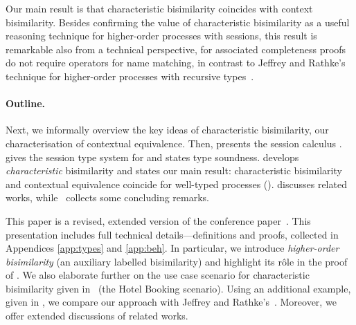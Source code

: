 Our main result is that characteristic  %
bisimilarity coincides with context bisimilarity.
Besides confirming the value of characteristic bisimilarity as a useful reasoning technique for 
higher-order processes with sessions,
this result is 
remarkable 
also from a technical perspective, for associated 
completeness proofs do not require 
operators for 
name matching,
in contrast to Jeffrey and Rathke's technique for higher-order processes
with recursive types~\cite{JeffreyR05}.




\paragraph{Outline.} 
Next,
we  informally overview the
key ideas of characteristic bisimilarity, 
our 
characterisation of contextual equivalence.
Then,   presents 
the %
session calculus \HOp. 
 gives the session type system for \HOp
and states type soundness.
{} 
develops %
\emph{characteristic} bisimilarity and 
states our main result: characteristic bisimilarity and contextual equivalence coincide for 
well-typed \HOp processes ().
 discusses related works, while
~collects some concluding remarks. 

This paper is a revised, extended version of the conference paper~\cite{kouzapas_et_al:LIPIcs:2015:5365}.
This presentation includes full technical details---definitions and proofs, collected in Appendices \ref{app:types} and \ref{app:beh}.
In particular, we introduce \emph{higher-order bisimilarity} (an auxiliary labelled 
bisimilarity) 
and highlight its r\^{o}le
in the proof of . 
We also elaborate further  on the 
use case scenario 
for characteristic bisimilarity 
given in~\cite{kouzapas_et_al:LIPIcs:2015:5365} (the Hotel Booking scenario).
Using an additional example, given in  
, we compare our approach with Jeffrey and Rathke's~\cite{JeffreyR05}. 
Moreover, we offer extended discussions of related works.

